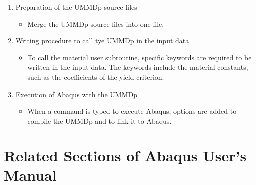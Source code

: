 \documentclass[11pt,a4paper,twoside,final,onecolumn,titlepage]{article}
\begin{document}
\begin{enumerate}
	\item Preparation of the UMMDp source files
	\begin{itemize}
     	\item Merge the UMMDp source files into one file.\\
  	\end{itemize}
  	\item Writing procedure to call tye UMMDp in the input data
  	\begin{itemize}
     	\item To call the material user subroutine, specific keywords are required to be written in the input data. The keywords include the material constants, such as the coefficients of the yield criterion.\\
  	\end{itemize}
  	\item Execution of Abaqus with the UMMDp
  	\begin{itemize}
     	\item When a command is typed to execute Abaqus, options are added to compile the UMMDp and to link it to Abaqus.\\
  	\end{itemize}
\end{enumerate}

\newpage
\section{Related Sections of Abaqus User's Manual}
\vspace{0.5cm}
\end{document}
